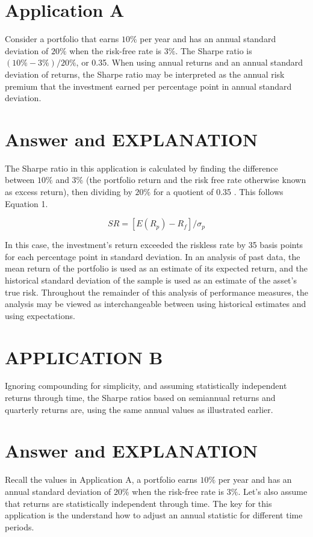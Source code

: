 \documentclass[11pt]{article}
\begin{document}
\section*{Application A}
Consider a portfolio that earns $10 \%$ per year and has an annual standard deviation of $20 \%$ when the risk-free rate is $3 \%$. The Sharpe ratio is $(10 \%-3 \%) / 20 \%$, or 0.35. When using annual returns and an annual standard deviation of returns, the Sharpe ratio may be interpreted as the annual risk premium that the investment earned per percentage point in annual standard deviation.

\section*{Answer and EXPLANATION}
The Sharpe ratio in this application is calculated by finding the difference between $10 \%$ and 3\% (the portfolio return and the risk free rate otherwise known as excess return), then dividing by $20 \%$ for a quotient of 0.35 . This follows Equation 1.

$$
S R=\left[E\left(R_{p}\right)-R_{f}\right] / \sigma_{p}
$$

In this case, the investment's return exceeded the riskless rate by 35 basis points for each percentage point in standard deviation. In an analysis of past data, the mean return of the portfolio is used as an estimate of its expected return, and the historical standard deviation of the sample is used as an estimate of the asset's true risk. Throughout the remainder of this analysis of performance measures, the analysis may be viewed as interchangeable between using historical estimates and using expectations.

\section*{APPLICATION B}
Ignoring compounding for simplicity, and assuming statistically independent returns through time, the Sharpe ratios based on semiannual returns and quarterly returns are, using the same annual values as illustrated earlier.

\section*{Answer and EXPLANATION}
Recall the values in Application A, a portfolio earns $10 \%$ per year and has an annual standard deviation of $20 \%$ when the risk-free rate is $3 \%$. Let's also assume that returns are statistically independent through time. The key for this application is the understand how to adjust an annual statistic for different time periods.
\end{document}
